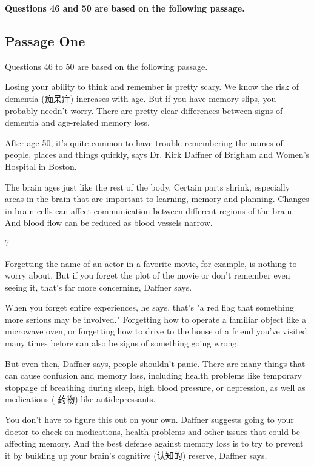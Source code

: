 \documentclass[UTF8,11pt]{ctexart}
\begin{document}
\textbf{Questions 46 and 50 are based on the following passage.}


\subsection*{Passage One}


Questions 46 to 50 are based on the following passage.


Losing your ability to think and remember is pretty scary. We know the risk of dementia (痴呆症) increases with age. But if you have memory slips, you probably needn't worry. There are pretty clear differences between signs of dementia and age-related memory loss.


After age 50, it's quite common to have trouble remembering the names of people, places and things quickly, says Dr. Kirk Daffner of Brigham and Women's Hospital in Boston.


The brain ages just like the rest of the body. Certain parts shrink, especially areas in the brain that are important to learning, memory and planning. Changes in brain cells can affect communication between different regions of the brain. And blood flow can be reduced as blood vessels narrow.


7


Forgetting the name of an actor in a favorite movie, for example, is nothing to worry about. But if you forget the plot of the movie or don't remember even seeing it, that's far more concerning, Daffner says.


When you forget entire experiences, he says, that's "a red flag that something more serious may be involved." Forgetting how to operate a familiar object like a microwave oven, or forgetting how to drive to the house of a friend you've visited many times before can also be signs of something going wrong.


But even then, Daffner says, people shouldn't panic. There are many things that can cause confusion and memory loss, including health problems like temporary stoppage of breathing during sleep, high blood pressure, or depression, as well as medications ( 药物) like antidepressants.


You don't have to figure this out on your own. Daffner suggests going to your doctor to check on medications, health problems and other issues that could be affecting memory. And the best defense against memory loss is to try to prevent it by building up your brain's cognitive (认知的) reserve, Daffner says.
\end{document}
